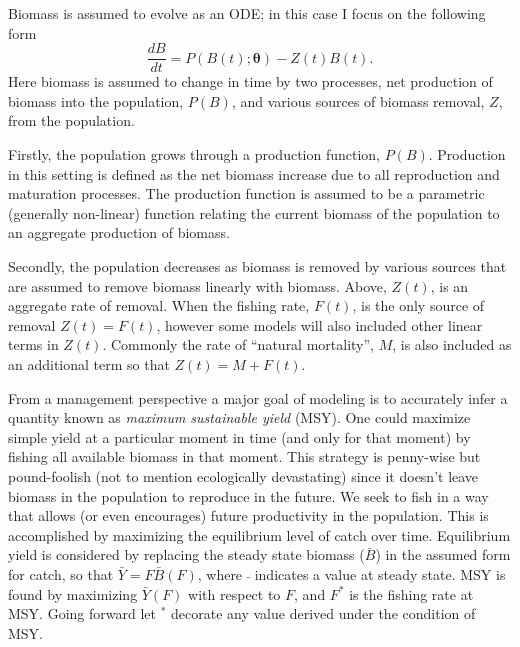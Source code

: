 \documentclass[11pt]{ucscthesis}
\begin{document}
{%
Biomass is assumed to evolve as an ODE; in this case I focus on the following
form
%
\begin{equation}
\frac{dB}{dt} = P(B(t); \bm{\theta}) - Z(t)B(t). \label{ode}
\end{equation}
Here biomass is assumed to change in time by two processes, net production of
biomass into the population, $P(B)$, and various sources of biomass removal, $Z$, from the
population.

Firstly, the population grows through a production function, $P(B)$. Production
in this setting is defined as the net biomass increase due to all reproduction
and maturation processes.
The production function is assumed to be a parametric (generally non-linear) function
relating the current biomass of the population to an aggregate production
of biomass.

%
Secondly, the population decreases as biomass is removed by various sources that are
assumed to remove biomass linearly with biomass. Above, $Z(t)$, is an
aggregate rate of removal. When the fishing rate, $F(t)$, is the only source of removal
$Z(t)=F(t)$, however some models will also included other linear terms in $Z(t)$.
Commonly the rate of ``natural mortality'', $M$, is also included as an additional term
so that $Z(t)=M+F(t)$.

From a management perspective a major goal of modeling is to accurately infer
a quantity known as \emph{maximum sustainable yield} (MSY). One could maximize
simple yield at a particular moment in time (and only for that moment) by
fishing all available biomass in that moment. This strategy is penny-wise but
pound-foolish (not to mention ecologically devastating) since it doesn't leave
biomass in the population to reproduce in the future. We seek to fish in a way
that allows (or even encourages) future productivity in the population. This is
accomplished by maximizing the equilibrium level of catch over time.
Equilibrium yield is considered by replacing the steady state biomass ($\bar B$)
in the assumed form for catch, so that $\bar Y = F\bar B(F)$, where $\bar~$
indicates a value at steady state.
MSY is found by maximizing $\bar Y(F)$ with respect to
$F$, and $F^*$ is the fishing rate at MSY. Going forward let $^*$ decorate any
value derived under the condition of MSY.

}
\end{document}
